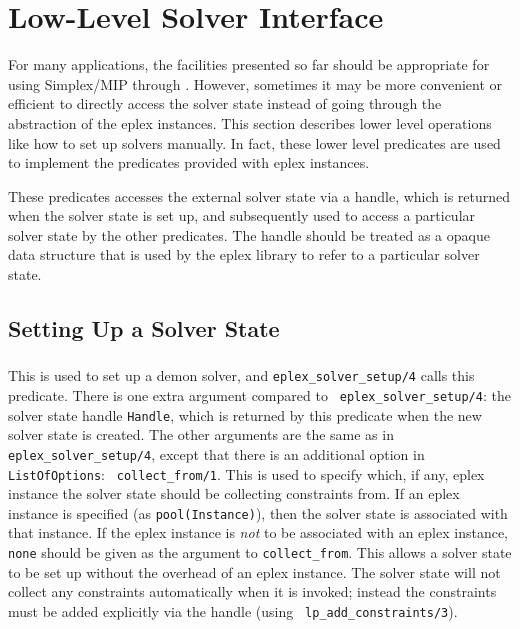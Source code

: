 \section{Low-Level Solver Interface}

For many applications, the facilities presented so far should be
appropriate for using Simplex/MIP through {\eclipse}.
However, sometimes it may be more convenient or efficient
to directly access the solver state
instead of going through the abstraction of the eplex instances. 
This section describes lower level operations like how to set up
solvers manually. In fact, these lower level predicates are used to
implement the predicates provided with eplex instances.

These predicates accesses the external solver state via a handle, which is
returned when the solver state is set up, and subsequently used to access a
particular solver state by the other predicates. The handle should be
treated as a opaque data structure that is used by the eplex library to
refer to a particular solver state.

\subsection{Setting Up a Solver State}

\subsubsection{}

This is used to set up a demon solver, and {\tt eplex_solver_setup/4} calls
this predicate. There is one extra argument compared to {\tt
  eplex_solver_setup/4}: the solver state handle {\tt Handle}, which is
returned by this predicate when the new solver state is created.
The other arguments are the same as in {\tt eplex_solver_setup/4}, except
that there is an additional option in {\tt ListOfOptions}: {\tt
  collect_from/1}. This is used to specify which, if any, eplex instance
the solver state should be collecting constraints from. If an eplex
instance is specified (as {\tt pool(Instance)}), then the solver state is
associated with that instance. If the eplex instance is {\it not\/} to be
associated with an eplex instance, {\tt none} should be given as the
argument to {\tt collect_from}. This allows a solver state to be set up
without the overhead of an eplex instance. The solver state will not
collect any constraints automatically when it is invoked; instead the
constraints must be added explicitly via the handle (using {\tt
  lp_add_constraints/3}).


